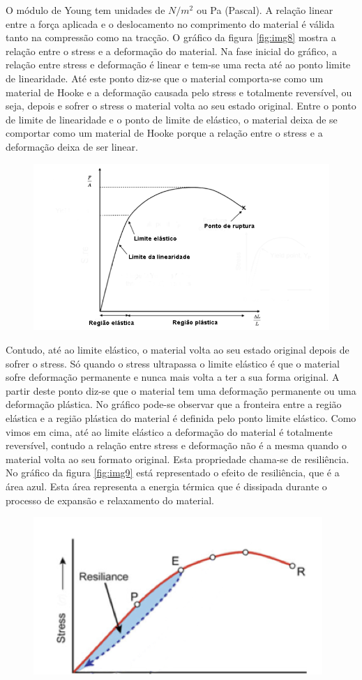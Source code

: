 \documentclass[
  portuguese,
  ]{book}
\begin{document}
O módulo de Young tem unidades de \(N/m^2\) ou Pa (Pascal).
A relação linear entre a força aplicada e o deslocamento no comprimento do material é válida tanto na compressão como na tracção. O gráfico da figura \ref{fig:img8} mostra a relação entre o stress e a deformação do material. Na fase inicial do gráfico, a relação entre stress e deformação é linear e tem-se uma recta até ao ponto limite de linearidade. Até este ponto diz-se que o material comporta-se como um material de Hooke e a deformação causada pelo stress e totalmente reversível, ou seja, depois e sofrer o stress o material volta ao seu estado original. Entre o ponto de limite de linearidade e o ponto de limite de elástico, o material deixa de se comportar como um material de Hooke porque a relação entre o stress e a deformação deixa de ser linear.

\begin{figure}

{\centering \includegraphics[width=0.5\linewidth]{img/lei_de_hooke_3} 

}

\end{figure}

Contudo, até ao limite elástico, o material volta ao seu estado original depois de sofrer o stress. Só quando o stress ultrapassa o limite elástico é que o material sofre deformação permanente e nunca mais volta a ter a sua forma original. A partir deste ponto diz-se que o material tem uma deformação permanente ou uma deformação plástica. No gráfico pode-se observar que a fronteira entre a região elástica e a região plástica do material é definida pelo ponto limite elástico.
Como vimos em cima, até ao limite elástico a deformação do material é totalmente reversível, contudo a relação entre stress e deformação não é a mesma quando o material volta ao seu formato original. Esta propriedade chama-se de resiliência. No gráfico da figura \ref{fig:img9} está representado o efeito de resiliência, que é a área azul. Esta área representa a energia térmica que é dissipada durante o processo de expansão e relaxamento do material.

\begin{figure}

{\centering \includegraphics[width=0.5\linewidth]{img/lei_de_hooke_4} 

}

\end{figure}
\end{document}
